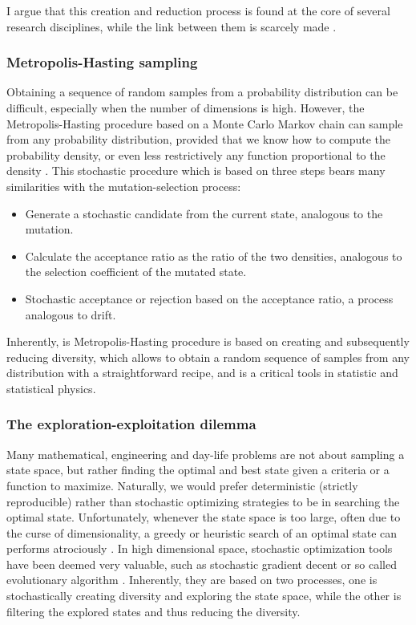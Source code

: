 I argue that this creation and reduction process is found at the core of several research disciplines, while the link between them is scarcely made \citep{Baeck1994, Eiben1998}. 

\subsubsection{Metropolis-Hasting sampling}
Obtaining a sequence of random samples from a probability distribution can be difficult, especially when the number of dimensions is high.
However, the Metropolis-Hasting procedure based on a Monte Carlo Markov chain can sample from any probability distribution, provided that we know how to compute the probability density, or even less restrictively any function proportional to the density \citep{Hastings1970}.
This stochastic procedure which is based on three steps bears many similarities with the mutation-selection process:
\begin{itemize}
	\item Generate a stochastic candidate from the current state, analogous to the mutation.
	\item Calculate the acceptance ratio as the ratio of the two densities, analogous to the selection coefficient of the mutated state.
	\item Stochastic acceptance or rejection based on the acceptance ratio, a process analogous to drift. 
\end{itemize}
Inherently, is Metropolis-Hasting procedure is based on creating and subsequently reducing diversity, which allows to obtain a random sequence of samples from any distribution with a straightforward recipe, and is a critical tools in statistic and statistical physics.

\subsubsection{The exploration-exploitation dilemma}
Many mathematical, engineering and day-life problems are not about sampling a state space, but rather finding the optimal and best state given a criteria or a function to maximize.
Naturally, we would prefer deterministic (strictly reproducible) rather than stochastic optimizing strategies to be in searching the optimal state.
Unfortunately, whenever the state space is too large, often due to the curse of dimensionality, a greedy or heuristic search of an optimal state can performs atrociously \citep{Bellman1966}.
In high dimensional space, stochastic optimization tools have been deemed very valuable, such as stochastic gradient decent or so called evolutionary algorithm \citep{Russell2010,Vikhar2017}.
Inherently, they are based on two processes, one is stochastically creating diversity and exploring the state space, while the other is filtering the explored states and thus reducing the diversity.


